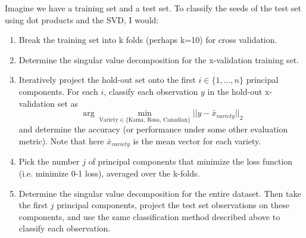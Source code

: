 \documentclass[paper=a4, fontsize=11pt]{scrartcl} %
\numberwithin{equation}{section} %
\numberwithin{figure}{section} %
\numberwithin{table}{section} %
\begin{document}
Imagine we have a training set and a test set. To classify the seeds of the test set using dot products and the SVD, I would:
\begin{enumerate}
\item Break the training set into k folds (perhaps k=10) for cross validation.
\item Determine the singular value decomposition for the x-validation training set.
\item Iteratively project the hold-out set onto the first $i \in \{1, ..., n\}$ principal components. For each $i$, classify each observation $y$ in the hold-out x-validation set as $$\arg \min_{\textrm{Variety} \in \{\textrm{Kama, Rosa, Canadian}\}} ||y -  \bar{x}_{variety}||_2 $$ and determine the accuracy (or performance under some other evaluation metric). Note that here $\bar{x}_{variety}$ is the mean vector for each variety.
\item Pick the number $j$ of principal components that minimize the loss function (i.e. minimize 0-1 loss), averaged over the k-folds.
\item Determine the singular value decomposition for the entire dataset. Then take the first $j$ principal components, project the test set observations on these components, and use the same classification method described above to classify each observation.
\end{enumerate}
\end{document}
